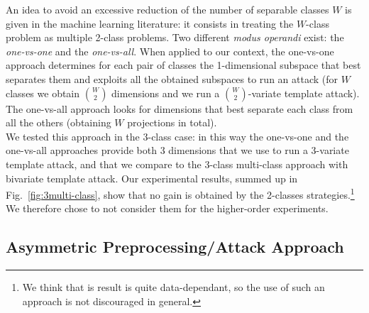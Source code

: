 An idea to avoid an excessive reduction of the number of separable classes $W$ is given in the machine learning literature: it consists in treating the $W$-class problem as  multiple 2-class problems. Two different \emph{modus operandi} exist: the \emph{one-vs-one} and the \emph{one-vs-all}. When applied to our context, the one-vs-one approach determines for each pair of classes the 1-dimensional subspace that best separates them and exploits all the obtained subspaces to run an attack (for $W$ classes we obtain ${W}\choose{2}$ dimensions and we run a ${W}\choose{2}$-variate template attack). The one-vs-all approach looks for dimensions that best separate each class from all the others (obtaining $W$ projections in total).\\


We tested this approach in the 3-class case: in this way the one-vs-one and the one-vs-all approaches provide both 3 dimensions that we use to run a $3$-variate template attack, and that we compare to the $3$-class multi-class approach with bivariate template attack. Our experimental results, summed up in Fig.~\ref{fig:3multi-class}, show that no gain  is obtained by the 2-classes strategies.\footnote{We think that is result is quite data-dependant, so the use of such an approach is not discouraged in general.} We therefore chose to not consider them for the higher-order experiments.



\subsection{Asymmetric Preprocessing/Attack Approach}\label{sec:asymmetric}

